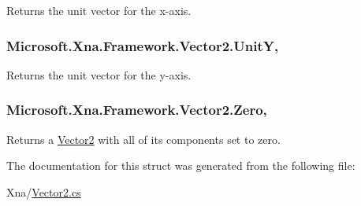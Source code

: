 Returns the unit vector for the x-\/axis.

\hypertarget{struct_microsoft_1_1_xna_1_1_framework_1_1_vector2_ac737216f0343a07a912c3fc34ec64569}{}
\subsubsection[{Unit\+Y}]{ Microsoft.\+Xna.\+Framework.\+Vector2.\+Unit\+Y\hspace{0.3cm}{\ttfamily [static]}, {\ttfamily [get]}}\label{struct_microsoft_1_1_xna_1_1_framework_1_1_vector2_ac737216f0343a07a912c3fc34ec64569}


Returns the unit vector for the y-\/axis.

\hypertarget{struct_microsoft_1_1_xna_1_1_framework_1_1_vector2_a326202f2b3a35f6b549d835dba935f93}{}
\subsubsection[{Zero}]{ Microsoft.\+Xna.\+Framework.\+Vector2.\+Zero\hspace{0.3cm}{\ttfamily [static]}, {\ttfamily [get]}}\label{struct_microsoft_1_1_xna_1_1_framework_1_1_vector2_a326202f2b3a35f6b549d835dba935f93}


Returns a \hyperlink{struct_microsoft_1_1_xna_1_1_framework_1_1_vector2}{Vector2} with all of its components set to zero.



The documentation for this struct was generated from the following file\+:\begin{DoxyCompactItemize}
\item 
Xna/\hyperlink{_vector2_8cs}{Vector2.\+cs}\end{DoxyCompactItemize}
